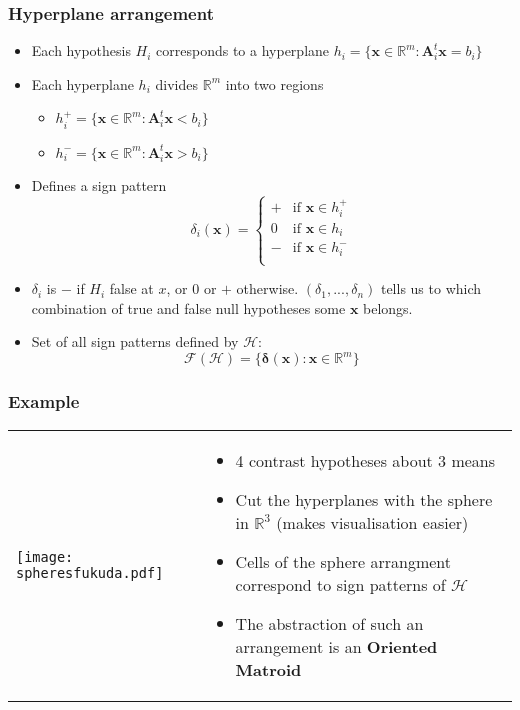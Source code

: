\documentclass[bigger]{beamer}
\newcommand{\bs}[1]{\bm{#1}}
\newcommand{\R}{\mathbb{R}}
\providecommand{\alert}[1]{\textbf{#1}}
\begin{document}
\begin{frame}
 \frametitle{Hyperplane arrangement}
 \begin{itemize}
 \item Each hypothesis $H_i$ corresponds to a hyperplane $h_i =
   \{\bs{x} \in \mathbb{R}^m: \bs{A}_i^t\bs{x} = b_i\}$
 \item Each hyperplane $h_i$ divides $\mathbb{R}^m$ into two regions
   \begin{itemize}
   \item $h_i^+ = \{\bs{x} \in \mathbb{R}^m: \bs{A}_i^t\bs{x} <
     b_i\}$
   \item $h_i^- = \{\bs{x} \in \mathbb{R}^m: \bs{A}_i^t\bs{x}
     > b_i\}$
   \end{itemize}
 \item Defines a sign pattern
   \begin{equation}
     \label{eq:sign}
     \delta_i(\bs{x}) = \left\{
       \begin{array}{ll}
         + & \text{if } \bs{x} \in h_i^+\\
         0 & \text{if } \bs{x} \in h_i \\
         - & \text{if } \bs{x} \in h_i^-\\
       \end{array}\right.
   \end{equation}
 \item $\delta_i$ is $-$ if $H_i$ false at $x$, or $0$ or $+$
   otherwise. $(\delta_1,...,\delta_n)$ tells us to which combination
   of true and false null hypotheses some $\bs{x}$ belongs.

 \item Set of all sign patterns defined by $\mathscr{H}$:
   \begin{equation}
     \label{eq:faces}
     \mathcal{F}(\mathscr{H}) = \{\bs{\delta}(\bs{x}): \bs{x} \in \R^m\}
   \end{equation}
 \end{itemize}
\end{frame}

\begin{frame}
 \frametitle{Example}

\begin{tabular}{ll}
 \begin{minipage}{.4\textwidth}
 \texttt{[image: spheresfukuda.pdf]}
 \end{minipage} &
 \begin{minipage}{.6\textwidth}
   \begin{itemize}
   \item 4 contrast hypotheses about 3 means
   \item Cut the hyperplanes with the sphere in $\R^3$ (makes
     visualisation easier)
   \item Cells of the sphere arrangment correspond to sign patterns
     of $\mathscr{H}$
   \item The abstraction of such an arrangement is an \alert{Oriented Matroid}
   \end{itemize}
 \end{minipage}
\end{tabular}

\end{frame}
\end{document}
